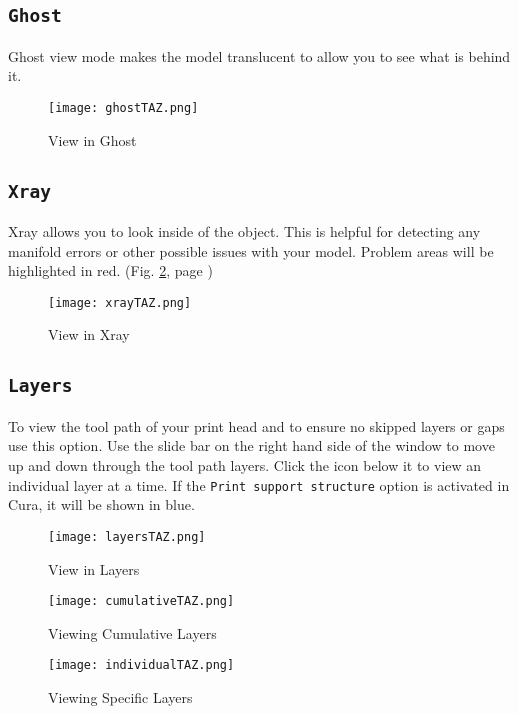\subsection{\texttt{Ghost}}
Ghost view mode makes the model translucent to allow you to see what is behind it.
\begin{figure}[H]
\centering
\texttt{[image: ghostTAZ.png]}
\caption{View in Ghost}
\label{fig:Ghost View}
\end{figure}

\subsection{\texttt{Xray}}
Xray allows you to look inside of the object. This is helpful for detecting any manifold errors or other possible issues with your model. Problem areas will be highlighted in red. (Fig. \ref{fig:Xray View}, page \pageref{fig:Xray View})
\begin{figure}[H]
\centering
\texttt{[image: xrayTAZ.png]}
\caption{View in Xray}
\label{fig:Xray View}
\end{figure}

\subsection{\texttt{Layers}}
To view the tool path of your print head and to ensure no skipped layers or gaps use this option. Use the slide bar on the right hand side of the window to move up and down through the tool path layers. Click the icon below it to view an individual layer at a time. If the \texttt{Print support structure} option is activated in Cura, it will be shown in blue.
\begin{figure}[H]
\centering
\texttt{[image: layersTAZ.png]}
\caption{View in Layers}
\label{fig:Layers View}
\end{figure}

\begin{figure}[H]
\centering
\texttt{[image: cumulativeTAZ.png]}
\caption{Viewing Cumulative Layers}
\label{fig:Mid Layers View}
\end{figure}

\begin{figure}[H]
\centering
\texttt{[image: individualTAZ.png]}
\caption{Viewing Specific Layers}
\label{fig:Viewing Specific Layer}
\end{figure}


